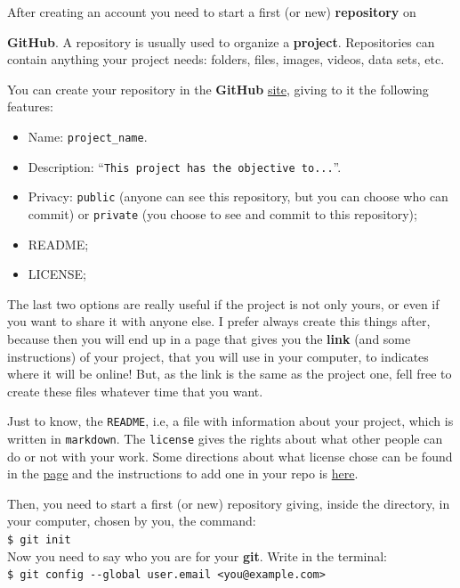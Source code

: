 \documentclass[12pt,a4paper,titlepage,brazil]{article}
\begin{document}
After creating an account you need to start a first (or new) {\bf repository} on {{\bf GitHub}. A repository is usually used to organize a {\bf project}. Repositories can contain anything your project needs: folders, files, images, videos, data sets, etc.

You can create your repository in the {\bf GitHub} \href{https://github.com}{site}, giving to it the following features:
\begin{itemize}
 \item Name: \texttt{project\_name}.
 \item Description: ``\texttt{This project has the objective to...}''.
 \item Privacy: \texttt{public} (anyone can see this repository, but you can choose who can commit) or \texttt{private} (you choose to see and commit to this repository);
 \item README;
 \item LICENSE;
\end{itemize}
The last two options are really useful if the project is not only yours, or even if you want to share it with anyone else. I prefer always create this things after, because then you will end up in a page that gives you the {\bf link} (and some instructions) of your project, that you will use in your computer, to indicates where it will be online! But, as the link is the same as the project one, fell free to create these files whatever time that you want.

Just to know, the \texttt{README}, i.e, a file with information about your project, which is written in \texttt{markdown}. The \texttt{license} gives the rights about what other people can do or not with your work. Some directions about what license chose can be found in the \href{https://opensource.guide/legal/#which-open-source-license-is-appropriate-for-my-project}{page} and the instructions to add one in your repo is \href{https://docs.github.com/en/github/creating-cloning-and-archiving-repositories/licensing-a-repository}{here}.

Then, you need to start a first (or new) repository giving, inside the directory, in your computer, chosen by you, the command:\\

\texttt{\$ git init}\\

Now you need to say who you are for your {\bf git}. Write in the terminal:\\

\texttt{\$ git config -\hspace{0.01cm}-global user.email <you@example.com>}

}
\end{document}
